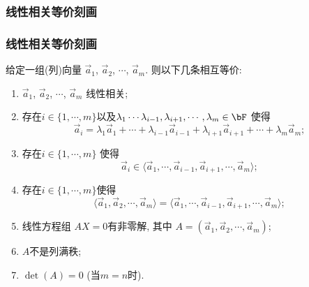 \subsubsection{线性相关等价刻画}
\begin{frame}\frametitle{线性相关等价刻画}
给定一组(列)向量 $\vec{a}_1$, $\vec{a}_2$, $\cdots$, $\vec{a}_m$. 则以下几条相互等价:
\begin{enumerate}
\item $\vec{a}_1$, $\vec{a}_2$, $\cdots$, $\vec{a}_m$ 线性相关;
\pp
\bigskip

\item 存在$i\in\{1,\cdots,m\}$以及$\lambda_1\cdots\lambda_{i-1},\lambda_{i+1},\cdots,\lambda_m\in \bF$ 使得
\[\vec{a}_i=\lambda_1\vec{a}_1 + \cdots+ \lambda_{i-1}\vec{a}_{i-1}  +\lambda_{i+1}\vec{a}_{i+1} + \cdots + \lambda_m\vec{a}_m;\]
\pp
\bigskip

\item 存在$i\in\{1,\cdots,m\}$ 使得
\[\vec{a}_i \in \langle \vec{a}_1,\cdots,\vec{a}_{i-1},\vec{a}_{i+1},\cdots,\vec{a}_m\rangle;\]
\pp
\bigskip

\item 存在$i\in\{1,\cdots,m\}$使得
\[\langle \vec{a}_1,\vec{a}_{2},\cdots,\vec{a}_m\rangle = \langle \vec{a}_1,\cdots,\vec{a}_{i-1},\vec{a}_{i+1},\cdots,\vec{a}_m\rangle;\]
\pp
\bigskip

\item 线性方程组 $AX=0$有非零解, 其中 $A=(\vec{a}_1,\vec{a}_{2},\cdots,\vec{a}_m)$;
\pp
\bigskip

\item $A$不是列满秩;
\pp
\bigskip

\item $\det(A)=0$ (当$m=n$时).
\end{enumerate}
\end{frame}






